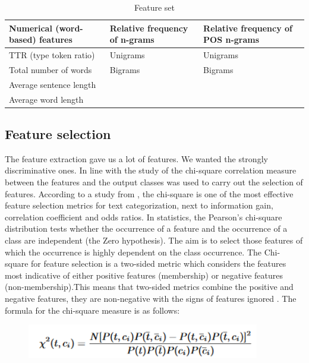 \documentclass{clv3}
\begin{document}
\begin{table}[h]
\centering
\caption{Feature set}
\label{table3}
\begin{tabular}{|l|l|l|}
\hline
Numerical (word-based) features & Relative frequency of n-grams & Relative frequency of POS n-grams \\ \hline
TTR (type token ratio)          & Unigrams                      & Unigrams                          \\ \hline
Total number of words         & Bigrams                       & Bigrams                           \\ \hline
Average sentence length         &                               &                                   \\ \hline
Average word length             &                               &                                   \\ \hline
\end{tabular}
\end{table}

\subsection{Feature selection}
The feature extraction gave us a lot of features. We wanted the strongly discriminative ones. In line with the study of \citet{cruz2013italica} the chi-square correlation measure between the features and the output classes was used to carry out the selection of features. According to a study  from \citet{zheng2004feature}, the chi-square is one of the most effective feature selection metrics for text categorization, next to information gain, correlation coefficient and odds ratios.  In statistics, the Pearson's chi-square distribution tests whether the occurrence of a feature and the occurrence of a class are independent (the Zero hypothesis). The aim is to select those features of which the occurrence is highly dependent on the class occurrence. The Chi- square for feature selection is a two-sided metric which considers the features most indicative of either positive features (membership) or negative features (non-membership).This means that two-sided metrics combine the positive and negative features, they are non-negative with the signs of features ignored \cite{zheng2004feature}. The formula for the chi-square measure is as follows:
\begin{figure}[h]
\includegraphics[width=4in]{formulechi2}
\end{figure}
\end{document}
